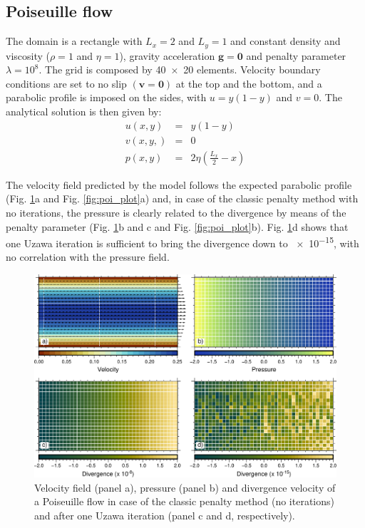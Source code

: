 \documentclass[hidelinks,11pt,a4paper]{article}
\begin{document}
\subsection{Poiseuille flow}\label{sec:poiseuille}
The domain is a rectangle with $L_x=2$ and $L_y=1$ and constant density and viscosity ($\rho=1$ and $\eta=1$), gravity acceleration $\bm{g}=\bm{0}$ and penalty parameter $\lambda=10^8$. The grid is composed by \num{40x20} elements. Velocity boundary conditions are set to no slip $(\bm{v}=\bm{0})$ at the top and the bottom, and a parabolic profile is imposed on the sides, with $u=y(1-y)$ and $v=0$. The analytical solution is then given by:
\begin{eqnarray}
u(x,y)&=&y(1-y)\nonumber \\
v(x,y,)&=&0\nonumber \\
p(x,y)&=&2\eta\left(\frac{L_x}{2}-x\right)\nonumber
\end{eqnarray}

The velocity field predicted by the model follows the expected parabolic profile (Fig. \ref{fig:poiseuille}a and Fig. \ref{fig:poi_plot}a) and, in case of the classic penalty method with no iterations, the pressure is clearly related to the divergence by means of the penalty parameter (Fig. \ref{fig:poiseuille}b and c and Fig. \ref{fig:poi_plot}b). Fig. \ref{fig:poiseuille}d shows that one Uzawa iteration is sufficient to bring the divergence down to \num{e-15}, with no correlation with the pressure field.

\begin{figure}
\noindent\includegraphics[width=\textwidth]{./Figures/Poiseuille.pdf}
\caption{Velocity field (panel a), pressure (panel b) and divergence velocity of a Poiseuille flow in case of the classic penalty method (no iterations) and after one Uzawa iteration (panel c and d, respectively).}
\label{fig:poiseuille}
\end{figure}
\end{document}

